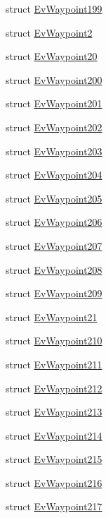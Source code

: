 \begin{DoxyCompactItemize}
struct \hyperlink{structcl__move__base__z_1_1EvWaypoint199}{Ev\+Waypoint199}
\item 
struct \hyperlink{structcl__move__base__z_1_1EvWaypoint2}{Ev\+Waypoint2}
\item 
struct \hyperlink{structcl__move__base__z_1_1EvWaypoint20}{Ev\+Waypoint20}
\item 
struct \hyperlink{structcl__move__base__z_1_1EvWaypoint200}{Ev\+Waypoint200}
\item 
struct \hyperlink{structcl__move__base__z_1_1EvWaypoint201}{Ev\+Waypoint201}
\item 
struct \hyperlink{structcl__move__base__z_1_1EvWaypoint202}{Ev\+Waypoint202}
\item 
struct \hyperlink{structcl__move__base__z_1_1EvWaypoint203}{Ev\+Waypoint203}
\item 
struct \hyperlink{structcl__move__base__z_1_1EvWaypoint204}{Ev\+Waypoint204}
\item 
struct \hyperlink{structcl__move__base__z_1_1EvWaypoint205}{Ev\+Waypoint205}
\item 
struct \hyperlink{structcl__move__base__z_1_1EvWaypoint206}{Ev\+Waypoint206}
\item 
struct \hyperlink{structcl__move__base__z_1_1EvWaypoint207}{Ev\+Waypoint207}
\item 
struct \hyperlink{structcl__move__base__z_1_1EvWaypoint208}{Ev\+Waypoint208}
\item 
struct \hyperlink{structcl__move__base__z_1_1EvWaypoint209}{Ev\+Waypoint209}
\item 
struct \hyperlink{structcl__move__base__z_1_1EvWaypoint21}{Ev\+Waypoint21}
\item 
struct \hyperlink{structcl__move__base__z_1_1EvWaypoint210}{Ev\+Waypoint210}
\item 
struct \hyperlink{structcl__move__base__z_1_1EvWaypoint211}{Ev\+Waypoint211}
\item 
struct \hyperlink{structcl__move__base__z_1_1EvWaypoint212}{Ev\+Waypoint212}
\item 
struct \hyperlink{structcl__move__base__z_1_1EvWaypoint213}{Ev\+Waypoint213}
\item 
struct \hyperlink{structcl__move__base__z_1_1EvWaypoint214}{Ev\+Waypoint214}
\item 
struct \hyperlink{structcl__move__base__z_1_1EvWaypoint215}{Ev\+Waypoint215}
\item 
struct \hyperlink{structcl__move__base__z_1_1EvWaypoint216}{Ev\+Waypoint216}
\item 
struct \hyperlink{structcl__move__base__z_1_1EvWaypoint217}{Ev\+Waypoint217}

\end{DoxyCompactItemize}
